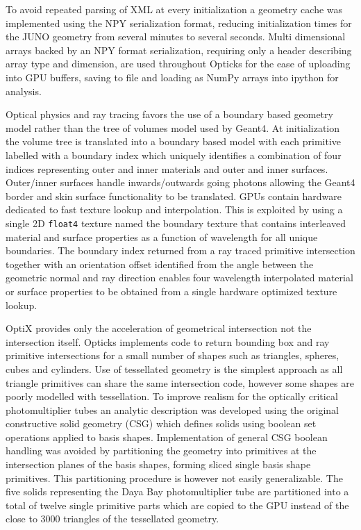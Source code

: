 \documentclass[a4paper]{jpconf}
\begin{document}
To avoid repeated parsing of XML at every initialization
a geometry cache was implemented using the NPY\cite{NPY} serialization format, reducing 
initialization times for the JUNO geometry from several minutes to several seconds.
Multi dimensional arrays backed by an NPY format serialization, requiring only a header describing array type and dimension,
are used throughout Opticks for the ease of uploading into GPU buffers, saving to file and 
loading as NumPy\cite{numpy} arrays into ipython\cite{ipython} for analysis.

Optical physics and ray tracing favors the use of a boundary based geometry model 
rather than the tree of volumes model used by Geant4. 
At initialization the volume tree is translated into a boundary based model 
with each primitive labelled with a boundary index which uniquely identifies 
a combination of four indices representing outer and inner materials and outer and inner surfaces.
Outer/inner surfaces handle inwards/outwards going photons allowing the Geant4 border and skin 
surface functionality to be translated.
GPUs contain hardware dedicated to fast texture lookup and interpolation. 
This is exploited by using a single 2D {\tt float4} texture named the boundary texture 
that contains interleaved material and surface properties as a function of wavelength for all 
unique boundaries. 
The boundary index returned from a ray traced primitive intersection together with 
an orientation offset identified from the angle between the geometric normal and ray direction
enables four wavelength interpolated material or surface properties to be 
obtained from a single hardware optimized texture lookup.

OptiX provides only the acceleration of geometrical intersection not the intersection itself.
Opticks implements code to return bounding box and ray primitive intersections for a small
number of shapes such as triangles, spheres, cubes and cylinders.  
Use of tessellated geometry is the simplest approach as all triangle primitives can
share the same intersection code, however some shapes are poorly modelled with tessellation.
To improve realism for the optically critical photomultiplier tubes an analytic description was developed 
using the original constructive solid geometry (CSG) which defines solids using boolean set operations applied to basis shapes.
Implementation of general CSG boolean handling was avoided by partitioning the geometry into primitives 
at the intersection planes of the basis shapes, forming sliced single basis shape primitives.
This partitioning procedure is however not easily generalizable.
%
The five solids representing the Daya Bay photomultiplier tube are partitioned into a total of twelve single primitive parts 
which are copied to the GPU instead of the close to 3000 triangles of the tessellated geometry. 
\end{document}

